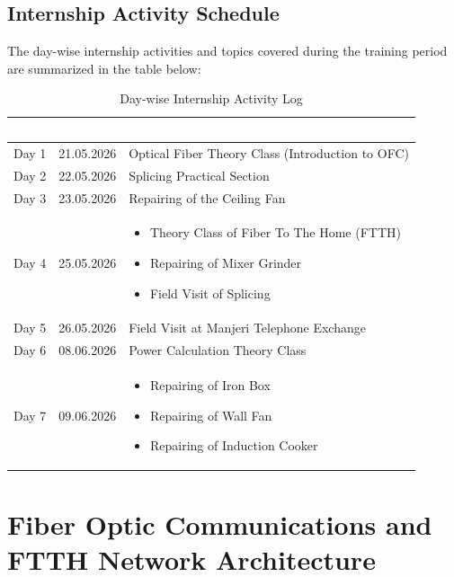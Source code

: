 \documentclass[11pt,a4paper]{report}
\begin{document}
\chapter*{Internship Activity Schedule}
The day-wise internship activities and topics covered during the training period are summarized in the table below:
\vspace{0.3cm}
\begin{table}[H]
\centering
\begin{tabularx}{\textwidth}{l l X}
\rowcolor{primaryColor}
\textcolor{white}{\textbf{Day}} & \textcolor{white}{\textbf{Date}} & \textcolor{white}{\textbf{Topics / Activities Covered}} \\
\midrule
Day 1 & 21.05.2026 & Optical Fiber Theory Class (Introduction to OFC) \\
Day 2 & 22.05.2026 & Splicing Practical Section \\
Day 3 & 23.05.2026 & Repairing of the Ceiling Fan \\
Day 4 & 25.05.2026 & \begin{itemize} \item Theory Class of Fiber To The Home (FTTH) \item Repairing of Mixer Grinder \item Field Visit of Splicing \end{itemize} \\
Day 5 & 26.05.2026 & Field Visit at Manjeri Telephone Exchange \\
Day 6 & 08.06.2026 & Power Calculation Theory Class \\
Day 7 & 09.06.2026 & \begin{itemize} \item Repairing of Iron Box \item Repairing of Wall Fan \item Repairing of Induction Cooker \end{itemize} \\
\bottomrule
\end{tabularx}
\caption{Day-wise Internship Activity Log}
\end{table}
\clearpage
{}
\setcounter{page}{1}
\part{Fiber Optic Communications and FTTH Network Architecture}
\end{document}
